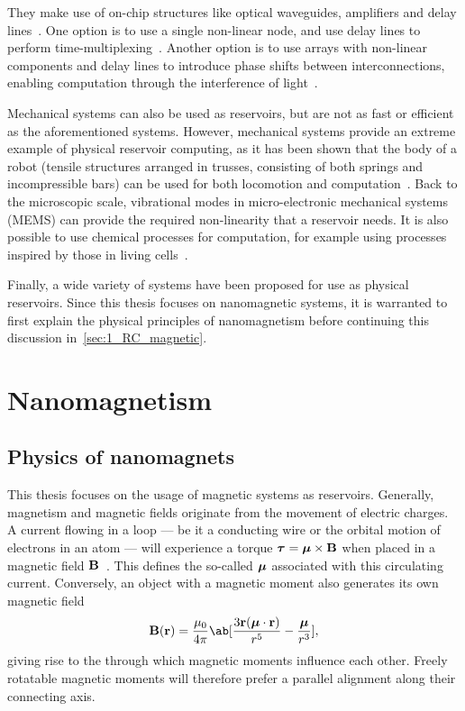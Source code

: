 They make use of on-chip structures like optical waveguides, amplifiers and delay lines~\cite{RC_RecentAdvances}.
One option is to use a single non-linear node, and use delay lines to perform time-multiplexing~\cite{appeltant2011information,RC_AllOptical}.
Another option is to use arrays with non-linear components and delay lines to introduce phase shifts between interconnections, enabling computation through the interference of light~\cite{RC_Photonic,RC_PhotonicSi}. \par
Mechanical systems can also be used as reservoirs, but are not as fast or efficient as the aforementioned systems.
However, mechanical systems provide an extreme example of physical reservoir computing, as it has been shown that the body of a  robot (tensile structures arranged in trusses, consisting of both springs and incompressible bars) can be used for both locomotion and computation~\cite{RC_Tensegrity}.
Back to the microscopic scale, vibrational modes in micro-electronic mechanical systems (MEMS) can provide the required non-linearity that a reservoir needs.
It is also possible to use chemical processes for computation, for example using processes inspired by those in living cells~\cite{NanoscaleRC,ElectrochemicalPRC,RC_Chemical}. \par
Finally, a wide variety of  systems have been proposed for use as physical reservoirs.
Since this thesis focuses on nanomagnetic systems, it is warranted to first explain the physical principles of nanomagnetism before continuing this discussion in~\cref{sec:1_RC_magnetic}.

\newpage
\section{Nanomagnetism} \label{sec:1:Nanomagnetism}
\subsection{Physics of nanomagnets}
This thesis focuses on the usage of magnetic systems as reservoirs.
Generally, magnetism and magnetic fields originate from the movement of electric charges.
A current flowing in a loop --- be it a conducting wire or the orbital motion of electrons in an atom --- will experience a torque $\boldsymbol{\mathbf{\tau}} = \boldsymbol{\mathbf{\mu}} \times \boldsymbol{\mathbf{B}}$ when placed in a magnetic field $\boldsymbol{\mathbf{B}}$~\cite{IntroMagneticMaterials}.
This defines the so-called  $\boldsymbol{\mathbf{\mu}}$ associated with this circulating current.
Conversely, an object with a magnetic moment also generates its own magnetic field
\begin{equation}
	\vc{B}(\vc{r}) = \frac{\mu_0}{4 \pi} \ab[\frac{3 \vc{r} (\vc{\mu} \cdot \vc{r})}{r^5} - \frac{\vc{\mu}}{r^3}] \mathrm{,}
\end{equation}
giving rise to the  through which magnetic moments influence each other. %
Freely rotatable magnetic moments will therefore prefer a parallel alignment along their connecting axis.

